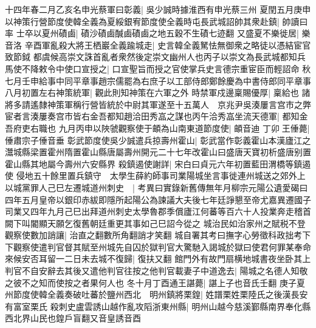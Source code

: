 十四年春二月乙亥名申光蔡軍曰彰義|{
	吳少誠時據淮西有申光蔡三州}
夏閏五月庚申以神策行營節度使韓全義為夏綏銀宥節度使全義時屯長武城詔帥其衆赴鎮|{
	帥讀曰率}
士卒以夏州磧鹵|{
	磧沙磧鹵醎鹵磧鹵之地五穀不生磧七迹翻}
又盛夏不樂徙居|{
	樂音洛}
辛酉軍亂殺大將王栖巖全義踰城走|{
	史言韓全義駑怯無御衆之略徒以憑結宦官致節鉞}
都虞候高崇文誅首亂者衆然後定崇文幽州人也丙子以崇文為長武城都知兵馬使不降敕令中使口宣授之|{
	口宣聖旨而授之官使掌兵史言德宗重宦臣而輕詔命}
秋七月壬申給事中同平章事趙宗儒罷為右庶子以工部侍郎鄭餘慶為中書侍郎同平章事　八月初置左右神策統軍|{
	觀此則知神策在六軍之外}
時禁軍戍邊稟賜優厚|{
	稟給也}
諸將多請遙隸神策軍稱行營皆統於中尉其軍遂至十五萬人　京兆尹吳湊屢言宫市之弊宦者言湊屢奏宫市皆右金吾都知趙洽田秀嵓之謀也丙午洽秀嵓坐流天德軍|{
	都知金吾府吏右職也}
九月丙申以陜虢觀察使于頔為山南東道節度使|{
	頔音迪}
丁卯王倕薨|{
	倕肅宗子倕音垂}
彰武節度使吳少誠遣兵掠壽州霍山|{
	彰武當作彰義霍山本漢廬江之灊城縣梁置霍州隋置霍山縣唐屬壽州開元二十七年改霍山曰盛唐天寶初析盛唐别置霍山縣其地屬今壽州六安縣界}
殺鎮遏使謝詳|{
	宋白曰貞元六年初置藍田渭橋等鎮遏使}
侵地五十餘里置兵鎮守　太學生薛約師事司業陽城坐言事徙連州城送之郊外上以城黨罪人己巳左遷城道州刺史　|{
	考異曰實錄新舊傳無年月柳宗元陽公遺愛碣曰四年五月皇帝以銀印赤紱即隱所起陽公為諫議大夫後七年廷諍懇至帝尤嘉異遷國子司業又四年九月己巳出拜道州刺史太學魯郡季償廬江何蕃等百六十人投業奔走稽首闕下叫閽顯天願乞復舊朝廷重更其事如己巳詔今從之}
城治民如治家州之賦税不登觀察使數加誚讓|{
	治直之翻數所角翻誚才笑翻}
城自署其考曰撫字心勞徵科政拙考下下觀察使遣判官督其賦至州城先自囚於獄判官大驚馳入謁城於獄曰使君何罪某奉命來候安否耳留一二日未去城不復歸|{
	復扶又翻}
館門外有故門扇横地城書夜坐卧其上判官不自安辭去其後又遣他判官往按之他判官載妻子中道逸去|{
	陽城之名德人知敬之彼不之知而使按之者果何人也}
冬十月丁酉通王諶薨|{
	諶上子也音氏壬翻}
庚子夏州節度使韓全義奏破吐蕃於鹽州西北　明州鎮將栗鍠|{
	姓譜栗姓栗陸氏之後漢長安有富室栗氏}
殺刺史盧雲誘山越作亂攻䧟浙東州縣|{
	明州山越今慈溪鄞縣南界奉化縣西北界山民也鍠戶盲翻又音皇誘音酉}


